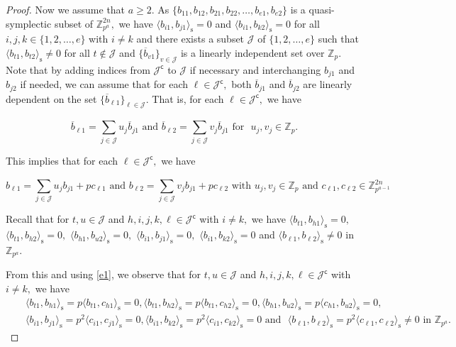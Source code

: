\documentclass{article}
\theoremstyle{remark}
\theoremstyle{definition}
\numberwithin{equation}{section}
\begin{document}
\begin{proof}
Now we assume that $a\geq 2.$ As $\{b_{11},b_{12},b_{21},b_{22},\ldots,b_{e1},b_{e2}\}$
is a quasi-symplectic subset of ${\mathbb{Z}^{2n}_{p^a}},$  we have $\langle b_{i1}, b_{j1} \rangle_{\text{s}}=0$ and $\langle b_{i1}, b_{k 2} \rangle_{\text{s}}=0$ for all $i ,j, k  \in \{1,2,\ldots,e\}$ with $i \neq k$ and there exists a subset $\mathcal{J}$ of $\{1,2,\ldots,e \}$ such that $\langle b_{t1}, b_{t2} \rangle_{\text{s}}\neq0$ for all $ t \not\in \mathcal{J}$ and $\{\overline{b}_{v1} \}_{v \in \mathcal{J}}$ is a linearly independent set over $\mathbb{Z}_p.$ 
 Note that by adding indices from $\mathcal{J}^\mathsf{c}$ to $\mathcal{J}$ if necessary and interchanging $b_{j1}$ and $b_{j2}$ if needed, we can assume that for each $\ell \in \mathcal{J}^\mathsf{c},$
 both $\overline{b}_{j1}$ and $\overline{b}_{j2}$ are linearly dependent on the set $\{\overline{b}_{\ell 1}\}_{\ell \in \mathcal{J}}.$ That is, for each $\ell \in \mathcal{J}^\mathsf{c},$ we have

$$\overline{b}_{\ell 1}=\sum\limits_{ j \in \mathcal{J}}^{}  u_j \overline{b}_{j 1} \text{~and~} \overline{b}_{\ell 2}=\sum\limits_{ j \in \mathcal{J}}^{}  v_j \overline{b}_{j 1} \text{~for ~} u_j, v_j \in \mathbb{Z}_p.$$

This implies that for each $\ell \in \mathcal{J}^\mathsf{c},$ we have

\begin{equation}\label{e1}
b_{\ell 1}=\sum\limits_{ j \in \mathcal{J}}^{}  u_j b_{j 1}+pc_{\ell 1} \text{~and~} {b}_{\ell 2}=\sum\limits_{ j \in \mathcal{J}}^{}  v_j b_{j 1}+pc_{\ell 2} \text{~with~} u_j, v_j \in \mathbb{Z}_p \text{~and~} c_{\ell 1}, c_{\ell 2} \in \mathbb{Z}_{p^{a-1}}^{2n} \end{equation}

Recall that for $t, u \in \mathcal{J}$ and $h,i,j,k,\ell \in \mathcal{J}^\mathsf{c}$ with $i \neq k,$ 
we have $\langle b_{t1}, b_{h1}\rangle_{\text{s}} =0,$  $\langle b_{t1}, b_{h2}\rangle_{\text{s}} =0,$ $\langle b_{h1}, b_{u2}\rangle_{\text{s}}=0,$ $\langle b_{i1}, b_{j1}\rangle_{\text{s}}=0,$ $\langle b_{i1}, b_{k2}\rangle_{\text{s}} =0$ and $ \langle b_{\ell1}, b_{\ell2}\rangle_{\text{s}} \neq 0$ in $\mathbb{Z}_{p^{a}}.$

 From this and using \eqref{e1}, we observe that for $t, u \in \mathcal{J}$ and $h,i,j,k,\ell \in \mathcal{J}^\mathsf{c}$ with $i \neq k,$ we have
 \begin{eqnarray}\label{e2}
 &&    \langle b_{t1}, b_{h1}\rangle_{\text{s}} =p\langle b_{t1},  c_{h1}\rangle_{\text{s}} =0,    \langle b_{t1}, b_{h2}\rangle_{\text{s}} =p\langle b_{t1},  c_{h2}\rangle_{\text{s}} =0, \langle b_{h1}, b_{u2}\rangle_{\text{s}} =p\langle c_{h1},  b_{u2}\rangle_{\text{s}} = 0, 
 \nonumber\\ &&
\langle b_{i1}, b_{j1}\rangle_{\text{s}} =p^2\langle c_{i1},  c_{j1}\rangle_{\text{s}} = 0,   \langle b_{i1}, b_{k2}\rangle_{\text{s}} =p^2\langle c_{i1},  c_{k2}\rangle_{\text{s}} = 0
  \text{~and ~} 
 \langle b_{\ell1}, b_{\ell2}\rangle_{\text{s}} =p^2\langle c_{\ell1},  c_{\ell2}\rangle_{\text{s}} \neq 0  \text{~in~} \mathbb{Z}_{p^{a}}. ~ \end{eqnarray} 
 

\end{proof}
\end{document}
